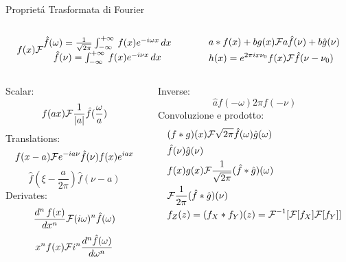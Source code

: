 \documentclass[asd-beamer.tex]{subfiles}
\begin{document}
\begin{wordonframe}{Propriet\'a Trasformata di Fourier}
\begin{columns}
\begin{column}{0.5\textwidth}
\begin{align*}
f(x)\mathcal{F}{}\begin{matrix}
\hat{f}(\omega)=\frac{1}{\sqrt{2\pi}}\int_{-\infty}^{+\infty}\,f(x)e^{-i\omega x}\,dx\\
\hat{f}(\nu)=\int_{-\infty}^{+\infty}\,f(x)e^{-i\nu x}\,dx\\
\end{matrix}
\end{align*}
\end{column}
\begin{column}{0.5\textwidth}
\begin{align*}
&a*f(x)+bg(x)\mathcal{F}{}a\hat{f}(\nu)+b\hat{g}(\nu)\\
&h(x)=e^{2\pi ix\nu_0}f(x)\mathcal{F}{}\hat{f}(\nu-\nu_0)
\end{align*}
\end{column}
\end{columns}
\begin{columns}
\begin{column}{0.5\textwidth}
Scalar: \[f(ax)\mathcal{F}{}\frac{1}{|a|}\hat{f}(\frac{\omega}{a}) \]
Translations:
\[f(x-a)\mathcal{F}{}e^{-ia\nu}\hat{f}(\nu)f(x)e^{iax}\]
\[\hat{f}(\xi-\frac{a}{2\pi}) \hat{f}(\nu-a)\]
Derivates:
\[\frac{d^n\,f(x)}{dx^n}\mathcal{F}{}(i\omega)^n\hat{f}(\omega)\]
\[x^nf(x)\mathcal{F}{}i^n\frac{d^n\hat{f}(\omega)}{d\omega^n}\]
\end{column}
\begin{column}{0.5\textwidth}
Inverse: \[\hat{a} f(-\omega) 2\pi f(-\nu)\]
Convoluzione e prodotto:
\begin{align*}
&(f*g)(x)\mathcal{F}{}\sqrt{2\pi}\hat{f}(\omega)\hat{g}(\omega)\\
&\hat{f}(\nu)\hat{g}(\nu)\\
&f(x)g(x)\mathcal{F}{}\frac{1}{\sqrt{2\pi}}(\hat{f}*\hat{g})(\omega)\\
&\mathcal{F}{}\frac{1}{2\pi}(\hat{f}*\hat{g})(\nu)\\
&f_Z(z)=(f_X*f_Y)(z)={\mathcal{F}{}}^{-1}{[\mathcal{F}{[f_X]}\mathcal{F}{[f_Y]}]}
\end{align*}

\end{column}
\end{columns}
\end{wordonframe}
\end{document}
